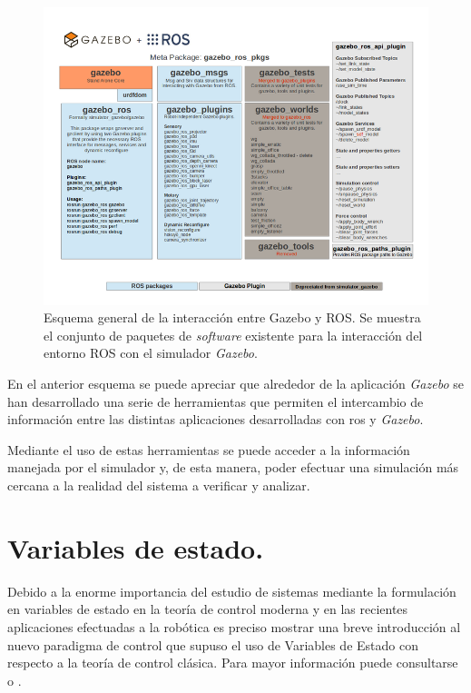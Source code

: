 \begin{figure}[h!]
\centering
\includegraphics[scale=0.7]{Figuras/Gazebo_ros_api}
\caption[Esquema general de la interacción entre Gazebo y ROS]{Esquema general de la interacción entre Gazebo y ROS. Se muestra el conjunto de paquetes de \emph{software} existente para la interacción del entorno ROS con el simulador \emph{Gazebo}.}
\label{fig:gazebo-ros}
\end{figure}

En el anterior esquema se puede apreciar que alrededor de la aplicación \emph{Gazebo} se han desarrollado una serie de herramientas que permiten el intercambio de información entre las distintas aplicaciones desarrolladas con \acrshort{ros} y \emph{Gazebo}. \par 

Mediante el uso de estas herramientas se puede acceder a la información manejada por el simulador y, de esta manera, poder efectuar una simulación más cercana a la realidad del sistema a verificar y analizar. \par  

\section{Variables de estado.}

Debido a la enorme importancia del estudio de sistemas mediante la formulación en variables de estado en la teoría de control moderna y en las recientes aplicaciones efectuadas a la robótica es preciso mostrar una breve introducción al nuevo paradigma de control que supuso el uso de Variables de Estado con respecto a la teoría de control clásica. Para mayor información puede consultarse \cite{dominguez2000control} o \cite{katsuhiko2010modern}. \par 

